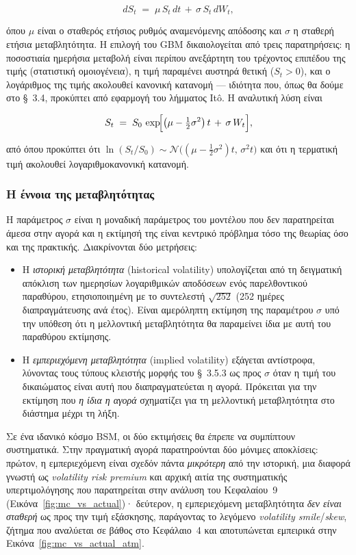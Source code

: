 \documentclass[12pt]{article}
\begin{document}
$$
dS_t \;=\; \mu\,S_t\,dt \,+\, \sigma\,S_t\,dW_t,
$$

όπου $\mu$ είναι ο σταθερός ετήσιος ρυθμός αναμενόμενης απόδοσης και $\sigma$ η σταθερή ετήσια μεταβλητότητα. Η επιλογή του GBM δικαιολογείται από τρεις παρατηρήσεις: η ποσοστιαία ημερήσια μεταβολή είναι περίπου ανεξάρτητη του τρέχοντος επιπέδου της τιμής (στατιστική ομοιογένεια), η τιμή παραμένει αυστηρά θετική ($S_t > 0$), και ο λογάριθμος της τιμής ακολουθεί κανονική κατανομή — ιδιότητα που, όπως θα δούμε στο \S~3.4, προκύπτει από εφαρμογή του λήμματος Itô. Η αναλυτική λύση είναι

$$
S_t \;=\; S_0\,\exp\!\Bigl[\bigl(\mu - \tfrac{1}{2}\sigma^2\bigr)\,t \,+\, \sigma\,W_t\Bigr],
$$

από όπου προκύπτει ότι $\ln(S_t/S_0) \sim \mathcal{N}\!\bigl((\mu - \tfrac12\sigma^2)t,\, \sigma^2 t\bigr)$ και ότι η τερματική τιμή ακολουθεί λογαριθμοκανονική κατανομή.

\subsubsection{Η έννοια της μεταβλητότητας}

Η παράμετρος $\sigma$ είναι η μοναδική παράμετρος του μοντέλου που δεν παρατηρείται άμεσα στην αγορά και η εκτίμησή της είναι κεντρικό πρόβλημα τόσο της θεωρίας όσο και της πρακτικής. Διακρίνονται δύο μετρήσεις:

\begin{itemize}
  \item Η \emph{ιστορική μεταβλητότητα} (historical volatility) υπολογίζεται από τη δειγματική απόκλιση των ημερησίων λογαριθμικών αποδόσεων ενός παρελθοντικού παραθύρου, ετησιοποιημένη με το συντελεστή $\sqrt{252}$ (252 ημέρες διαπραγμάτευσης ανά έτος). Είναι αμερόληπτη εκτίμηση της παραμέτρου $\sigma$ υπό την υπόθεση ότι η μελλοντική μεταβλητότητα θα παραμείνει ίδια με αυτή του παραθύρου εκτίμησης.

  \item Η \emph{εμπεριεχόμενη μεταβλητότητα} (implied volatility) εξάγεται αντίστροφα, λύνοντας τους τύπους κλειστής μορφής του \S~3.5.3 ως προς $\sigma$ όταν η τιμή του δικαιώματος είναι αυτή που διαπραγματεύεται η αγορά. Πρόκειται για την εκτίμηση που \emph{η ίδια η αγορά} σχηματίζει για τη μελλοντική μεταβλητότητα στο διάστημα μέχρι τη λήξη.
\end{itemize}

Σε ένα ιδανικό κόσμο BSM, οι δύο εκτιμήσεις θα έπρεπε να συμπίπτουν συστηματικά. Στην πραγματική αγορά παρατηρούνται δύο μόνιμες αποκλίσεις: πρώτον, η εμπεριεχόμενη είναι σχεδόν πάντα \emph{μικρότερη} από την ιστορική, μια διαφορά γνωστή ως \emph{volatility risk premium} και αρχική αιτία της συστηματικής υπερτιμολόγησης που παρατηρείται στην ανάλυση του Κεφαλαίου~9 (Εικόνα~\ref{fig:mc_vs_actual})· δεύτερον, η εμπεριεχόμενη μεταβλητότητα \emph{δεν είναι σταθερή} ως προς την τιμή εξάσκησης, παράγοντας το λεγόμενο \emph{volatility smile}/\emph{skew}, ζήτημα που αναλύεται σε βάθος στο Κεφάλαιο~4 και αποτυπώνεται εμπειρικά στην Εικόνα~\ref{fig:mc_vs_actual_atm}.
\end{document}
